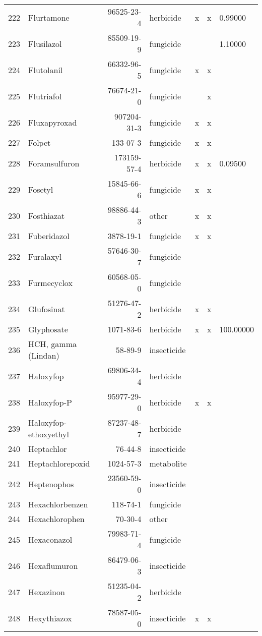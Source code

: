 \begin{longtable}{lp{3cm}rlp{1cm}p{1cm}p{1.5cm}}
  222 & Flurtamone & 96525-23-4 & herbicide & x & x & 0.99000 \\ 
  223 & Flusilazol & 85509-19-9 & fungicide &  &  & 1.10000 \\ 
  224 & Flutolanil & 66332-96-5 & fungicide & x & x &  \\ 
  225 & Flutriafol & 76674-21-0 & fungicide &  & x &  \\ 
  226 & Fluxapyroxad & 907204-31-3 & fungicide & x & x &  \\ 
  227 & Folpet & 133-07-3 & fungicide & x & x &  \\ 
  228 & Foramsulfuron & 173159-57-4 & herbicide & x & x & 0.09500 \\ 
  229 & Fosetyl & 15845-66-6 & fungicide & x & x &  \\ 
  230 & Fosthiazat & 98886-44-3 & other & x & x &  \\ 
  231 & Fuberidazol & 3878-19-1 & fungicide & x & x &  \\ 
  232 & Furalaxyl & 57646-30-7 & fungicide &  &  &  \\ 
  233 & Furmecyclox & 60568-05-0 & fungicide &  &  &  \\ 
  234 & Glufosinat & 51276-47-2 & herbicide & x & x &  \\ 
  235 & Glyphosate & 1071-83-6 & herbicide & x & x & 100.00000 \\ 
  236 & HCH, gamma (Lindan) & 58-89-9 & insecticide &  &  &  \\ 
  237 & Haloxyfop & 69806-34-4 & herbicide &  &  &  \\ 
  238 & Haloxyfop-P & 95977-29-0 & herbicide & x & x &  \\ 
  239 & Haloxyfop-ethoxyethyl & 87237-48-7 & herbicide &  &  &  \\ 
  240 & Heptachlor & 76-44-8 & insecticide &  &  &  \\ 
  241 & Heptachlorepoxid & 1024-57-3 & metabolite &  &  &  \\ 
  242 & Heptenophos & 23560-59-0 & insecticide &  &  &  \\ 
  243 & Hexachlorbenzen & 118-74-1 & fungicide &  &  &  \\ 
  244 & Hexachlorophen & 70-30-4 & other &  &  &  \\ 
  245 & Hexaconazol & 79983-71-4 & fungicide &  &  &  \\ 
  246 & Hexaflumuron & 86479-06-3 & insecticide &  &  &  \\ 
  247 & Hexazinon & 51235-04-2 & herbicide &  &  &  \\ 
  248 & Hexythiazox & 78587-05-0 & insecticide & x & x &  \\ 

\end{longtable}
